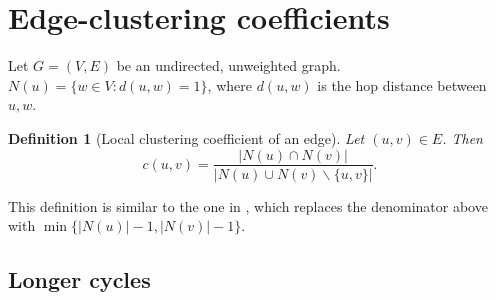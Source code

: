 \documentclass[twocolumn]{IEEEtran}
\newtheorem{definition}{Definition}
\theoremstyle{definition}
\begin{document}
\section{Edge-clustering coefficients}
Let $G = (V, E)$ be an undirected, unweighted graph.
$N(u) = \{ w \in V : d(u,w) = 1 \}$, where $d(u,w)$ is
the hop distance between $u,w$.
\begin{definition}[Local clustering coefficient of an edge]
  Let $(u,v) \in E$. Then
    \[ c(u,v) = \frac{ | N(u) \cap N(v) | }{ | N(u) \cup N(v) \backslash \{u, v \} | }. \]
\end{definition}

This definition is similar to the one in \cite{}, which replaces
the denominator above with $\min \{ |N(u)| - 1, |N(v)| - 1\}$.

\subsection{Longer cycles}
\end{document}
